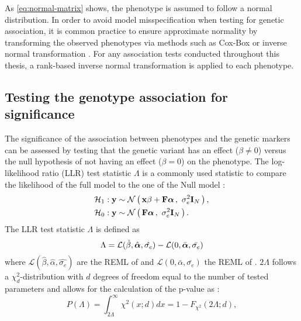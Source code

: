 As \cref{eq:normal-matrix} shows, the phenotype is assumed to follow a normal distribution. In order to avoid model misspecification when testing for genetic association, it is common practice to ensure approximate normality by transforming the observed phenotypes via methods such as Cox-Box \citep{Etzel2003,Yang2006} or inverse normal transformation \citep{Scuteri2007,Guan2008,Anttila2010,Casale2015}. For any association tests conducted throughout this thesis, a rank-based inverse normal transformation is applied to each phenotype.

\subsection{Testing the genotype association for significance}
\label{subsection:hypothesis-testing}
The significance of the association between phenotypes and the genetic markers can be assessed by testing that the genetic variant has an effect (\(\beta \neq 0\)) versus the null hypothesis \tnullH of not having an effect (\(\beta = 0\)) on the phenotype. The log-likelihood ratio (LLR) test statistic \(\Lambda\) is a commonly used statistic to compare the likelihood of the full model \taltH to the one of the Null model \tnullH:
%
\begin{align}
\mathcal{H}_1&: \boldsymbol{\mathbf{y}} \sim \mathcal{N}\left(\,{\boldsymbol{\mathbf{x}}\beta + \boldsymbol{\mathbf{F}}\boldsymbol{\mathbf{\alpha}}}\,,~{\sigma_e^2\boldsymbol{\mathbf{I}}_{N}}\,\right),\label{eq:lm_alt} \\
\mathcal{H}_0&: \boldsymbol{\mathbf{y}} \sim \mathcal{N}\left(\,{\boldsymbol{\mathbf{F}}\boldsymbol{\mathbf{\alpha}}}\,,~{\sigma_e^2\boldsymbol{\mathbf{I}}_{N}}\,\right). \label{eq:lm_null}
\end{align}
%
The LLR test statistic \(\Lambda\) is defined as
\begin{equation}
\Lambda  =  \mathcal{L} (\hat{\beta}, \hat{\boldsymbol{\mathbf{\alpha}}}, \hat{\sigma_{e}}) -  \mathcal{L} (0, \bar{\boldsymbol{\mathbf{\alpha}}}, \bar{\sigma_{e}})
\label{eq:llr}
\end{equation}
%
where \(\mathcal{L} (\hat{\beta}, \hat{\alpha}, \hat{\sigma_{e}})\) are the REML of \taltH and \(\mathcal{L} (0, \bar{\alpha}, \bar{\sigma_{e}})\) the REML of \tnullH. \(2\Lambda\) follows a \(\chi^2_{d}\)-distribution with \(d\) degrees of freedom equal to the number of tested parameters \citep{Wilks1938} and allows for the calculation of the p-value as :
\begin{equation}
P(\Lambda) = \int_{2\Lambda}^{\infty} \chi^2 \left(x;d\right)dx = 1- F_{\chi^2}\left(2\Lambda; d\right),
\label{eq:pvalue}
\end{equation}
